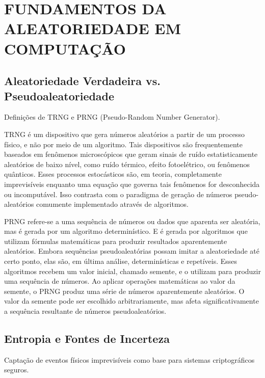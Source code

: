 \chapter{FUNDAMENTOS DA ALEATORIEDADE EM COMPUTAÇÃO} %

    \section{Aleatoriedade Verdadeira vs. Pseudoaleatoriedade}

        Definições de TRNG e PRNG (Pseudo-Random Number Generator).

        TRNG é um dispositivo que gera números aleatórios a partir
        de um processo físico, e não por meio de um algoritmo. Tais dispositivos são
        frequentemente baseados em fenômenos microscópicos que geram sinais de ruído
        estatisticamente aleatórios de baixo nível, como ruído térmico, efeito fotoelétrico, ou
        fenômenos quânticos. Esses processos estocásticos são, em teoria, completamente
        imprevisíveis enquanto uma equação que governa tais fenômenos for desconhecida
        ou incomputável. Isso contrasta com o paradigma de geração de números pseudo-
        aleatórios comumente implementado através de algoritmos.\nocite{6.1DefinicaoTRNG}

        PRNG refere-se a uma sequência de números ou dados que aparenta ser aleatória, 
        mas é gerada por um algoritmo determinístico.
        E é gerada por algoritmos que utilizam fórmulas matemáticas para produzir resultados aparentemente aleatórios. 
        Embora sequências pseudoaleatórias possam imitar a aleatoriedade até certo ponto, elas são, 
        em última análise, determinísticas e repetíveis.
        Esses algoritmos recebem um valor inicial, chamado semente, 
        e o utilizam para produzir uma sequência de números. 
        Ao aplicar operações matemáticas ao valor da semente, 
        o PRNG produz uma série de números aparentemente aleatórios. 
        O valor da semente pode ser escolhido arbitrariamente, 
        mas afeta significativamente a sequência resultante de números pseudoaleatórios.\nocite{6.1DefinicaoPRNG}

    \section{Entropia e Fontes de Incerteza}

        Captação de eventos físicos imprevisíveis como base para sistemas criptográficos seguros.

